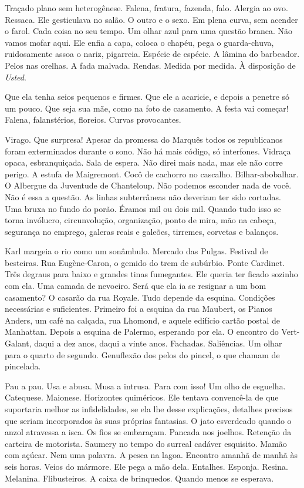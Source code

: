 Traçado plano sem heterogênese. Falena, fratura, fazenda, falo. Alergia
ao ovo. Ressaca. Ele gesticulava no salão. O outro e o sexo. Em plena
curva, sem acender o farol. Cada coisa no seu tempo. Um olhar azul para
uma questão branca. Não vamos mofar aqui. Ele enfia a capa, coloca o
chapéu, pega o guarda-chuva, ruidosamente assoa o nariz, pigarreia.
Espécie de espécie. A lâmina do barbeador. Pelos nas orelhas. A fada
malvada. Rendas. Medida por medida. À disposição de \emph{Usted}.

Que ela tenha seios pequenos e firmes. Que ele a acaricie, e depois a
penetre só um pouco. Que seja sua mãe, como na foto de casamento. A
festa vai começar! Falena, falanstérios, floreios. Curvas provocantes.

Virago. Que surpresa! Apesar da promessa do Marquês todos os
republicanos foram exterminados durante o sono. Não há mais código, só
interfones. Vidraça opaca, esbranquiçada. Sala de espera. Não direi mais
nada, mas ele não corre perigo. A estufa de Maigremont. Cocô de cachorro
no cascalho. Bilhar-abobalhar. O Albergue da Juventude de Chanteloup.
Não podemos esconder nada de você. Não é essa a questão. As linhas
subterrâneas não deveriam ter sido cortadas. Uma bruxa no fundo do
porão. Éramos mil ou dois mil. Quando tudo isso se torna invólucro,
circunvolução, organização, ponto de mira, mão na cabeça, segurança no
emprego, galeras reais e galeões, tirremes, corvetas e balanços.

Karl margeia o rio como um sonâmbulo. Mercado das Pulgas. Festival de
besteiras. Rua Eugène-Caron, o gemido do trem de subúrbio. Ponte
Cardinet. Três degraus para baixo e grandes tinas fumegantes. Ele queria
ter ficado sozinho com ela. Uma camada de nevoeiro. Será que ela ia se
resignar a um bom casamento? O casarão da rua Royale. Tudo depende da
esquina. Condições necessárias e suficientes. Primeiro foi a esquina da
rua Maubert, os Pianos Anders, um café na calçada, rua Lhomond, e aquele
edifício cartão postal de Manhattan. Depois a esquina de Palermo,
esperando por ela. O encontro do Vert-Galant, daqui a dez anos, daqui a
vinte anos. Fachadas. Saliências. Um olhar para o quarto de segundo.
Genuflexão dos pelos do pincel, o que chamam de pincelada.

Pau a pau. Usa e abusa. Musa a intrusa. Para com isso! Um olho de
esguelha. Catequese. Maionese. Horizontes quiméricos. Ele tentava
convencê-la de que suportaria melhor as infidelidades, se ela lhe desse
explicações, detalhes precisos que seriam incorporados às suas próprias
fantasias. O jato esverdeado quando o anzol atravessa a isca. Os fios se
embaraçam. Pancada nos joelhos. Retenção da carteira de motorista.
Saumery no tempo do surreal cadáver esquisito. Mamão com açúcar.
Nem uma palavra. A pesca na lagoa. Encontro amanhã de manhã às seis
horas. Veios do mármore. Ele pega a mão dela. Entalhes. Esponja. Resina.
Melanina. Flibusteiros. A caixa de brinquedos. Quando menos se esperava.


